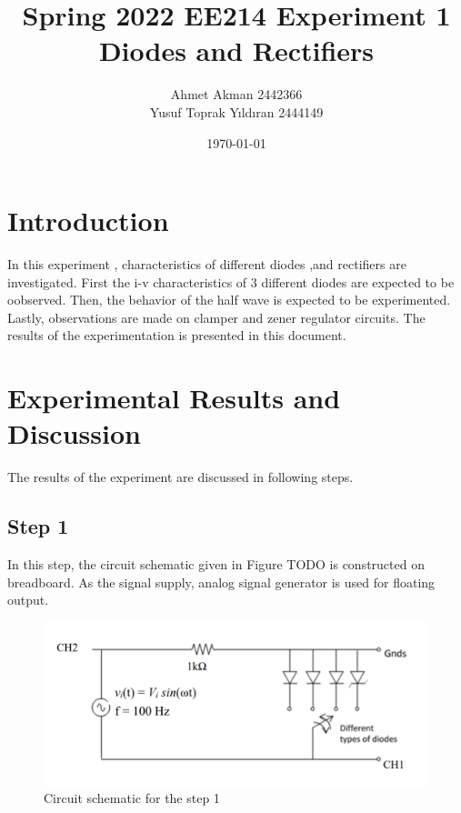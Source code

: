 \documentclass[letterpaper,12pt]{article}
\begin{document}
\thispagestyle{empty}

\title{Spring 2022 EE214 Experiment 1  \protect\\ Diodes and Rectifiers}
\author{Ahmet Akman 2442366 \protect\\ Yusuf Toprak Yıldıran 2444149}
\date{\today}
\maketitle
\tableofcontents
\section{Introduction}
In this experiment ,  characteristics of different  diodes ,and rectifiers are investigated. First the i-v characteristics of 3 different diodes are expected to be oobserved. Then, the behavior of the half wave is expected to be experimented. Lastly, observations are made on clamper and  zener regulator circuits. The results of the experimentation is presented in this document.
\section{Experimental Results and Discussion}
The results of the experiment are discussed in following steps.
\subsection{Step 1}
In this step, the circuit schematic given in Figure TODO is constructed on breadboard. As the signal supply, analog signal generator is used for floating output.
\begin{figure}[H]
\centering
\includegraphics[width=1\textwidth]{1_1.png}
\caption{Circuit schematic for the step 1}
\end{figure} 
\end{document}
